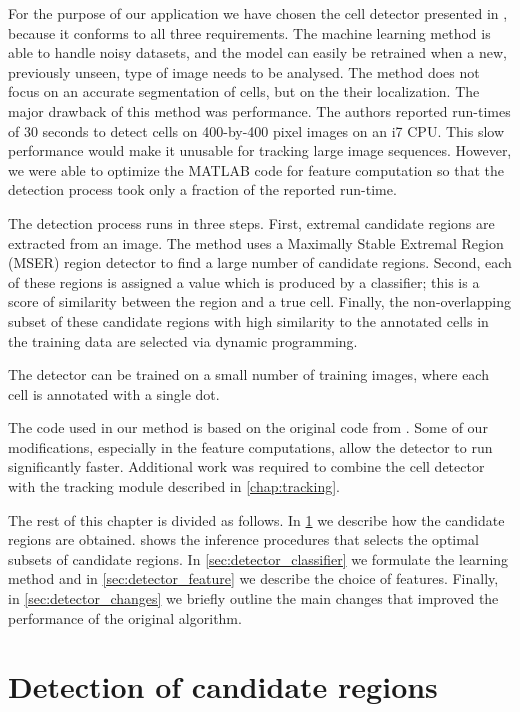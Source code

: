 	For the purpose of our application we have chosen the cell detector presented in \cite{arteta12}, because it conforms to all three requirements. The machine learning method is able to handle noisy datasets, and the model can easily be retrained when a new, previously unseen, type of image needs to be analysed. The method does not focus on an accurate segmentation of cells, but on the their localization. The major drawback of this method was performance. The authors reported run-times of 30 seconds to detect cells on 400-by-400 pixel images on an i7 CPU. This slow performance would make it unusable for tracking large image sequences. However, we were able to optimize the MATLAB code for feature computation so that the detection process took only a fraction of the reported run-time.
	
	The detection process runs in three steps. First, extremal candidate regions are extracted from an image. The method uses a Maximally Stable Extremal Region (MSER) region detector \cite{matas02} to find a large number of candidate regions. Second, each of these regions is assigned a value which is produced by a classifier; this is a score of similarity between the region and a true cell. Finally, the non-overlapping subset of these candidate regions with high similarity to the annotated cells in the training data are selected via dynamic programming.
	
	The detector can be trained on a small number of training images, where each cell is  annotated with a single dot. 

	The code used in our method is based on the original code from \cite{arteta12}. Some of our modifications, especially in the feature computations, allow the detector to run significantly faster. Additional work was required to combine the cell detector with the tracking module described in \cref{chap:tracking}.
	
	The rest of this chapter is divided as follows. In \cref{sec:detector_extremal} we describe how the candidate regions are obtained.  shows the inference procedures that selects the optimal subsets of candidate regions. In \cref{sec:detector_classifier} we formulate the learning method and in \cref{sec:detector_feature} we describe the choice of features. Finally, in \cref{sec:detector_changes} we briefly outline the main changes that improved the performance of the original algorithm.
	
	\section{Detection of candidate regions}
	\label{sec:detector_extremal}
	
